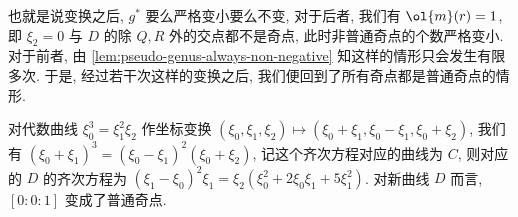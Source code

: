 也就是说变换之后, $g^*$ 要么严格变小要么不变,
对于后者, 我们有 $\ol{m}(r) = 1$,
即 $\xi_2 = 0$ 与 $D$ 的除 $Q,R$ 外的交点都不是奇点,
此时非普通奇点的个数严格变小.
对于前者, 由 \cref{lem:pseudo-genus-always-non-negative} 知这样的情形只会发生有限多次.
于是, 经过若干次这样的变换之后, 我们便回到了所有奇点都是普通奇点的情形.

\begin{exmp}
对代数曲线 $\xi_0^3 = \xi_1^2\xi_2$ 作坐标变换
$(\xi_0,\xi_1,\xi_2) \mapsto (\xi_0+\xi_1,\xi_0-\xi_1,\xi_0+\xi_2)$,
我们有 $(\xi_0+\xi_1)^3 = (\xi_0-\xi_1)^2(\xi_0+\xi_2)$,
记这个齐次方程对应的曲线为 $C$,
则对应的 $D$ 的齐次方程为 $(\xi_1-\xi_0)^2\xi_1 = \xi_2(\xi_0^2 + 2\xi_0\xi_1 + 5\xi_1^2)$.
对新曲线 $D$ 而言, $[0:0:1]$ 变成了普通奇点.
\end{exmp}
